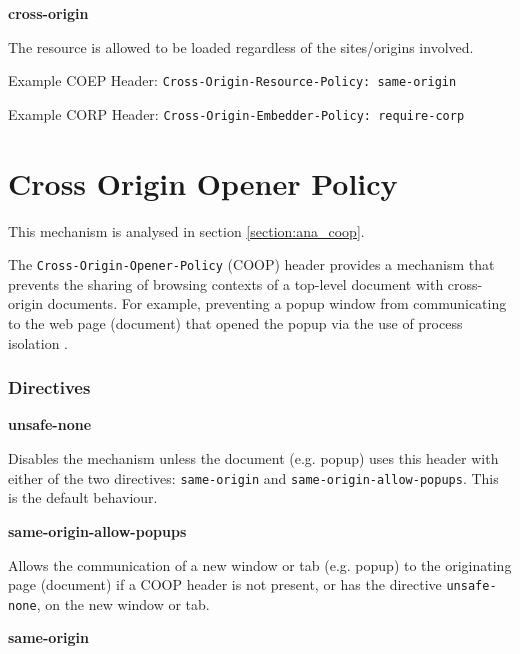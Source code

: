 \documentclass{mscreport}
\begin{document}
\vspace{0.7cm} \noindent
\textbf{cross-origin}

\vspace{0.3cm} \noindent
The resource is allowed to be loaded regardless of the sites/origins involved.

\vspace{0.3cm} \noindent
Example COEP Header: \texttt{Cross-Origin-Resource-Policy: same-origin}

\vspace{0.3cm} \noindent
Example CORP Header: \texttt{Cross-Origin-Embedder-Policy: require-corp}

\section{Cross Origin Opener Policy}
\label{section:bg_coop}

This mechanism is analysed in section \ref{section:ana_coop}.

\vspace{0.3cm} \noindent
The \texttt{Cross-Origin-Opener-Policy} (COOP) header provides a mechanism that prevents the sharing of browsing contexts of a top-level document with cross-origin documents. For example, preventing a popup window from communicating to the web page (document) that opened the popup via the use of process isolation \cite{Apple_undated-gj}.

\subsubsection{Directives}
\textbf{unsafe-none}

\vspace{0.3cm} \noindent
Disables the mechanism unless the document (e.g. popup) uses this header with either of the two directives: \texttt{same-origin} and \texttt{same-origin-allow-popups}. This is the default behaviour.

\vspace{0.7cm} \noindent
\textbf{same-origin-allow-popups}

\vspace{0.3cm} \noindent
Allows the communication of a new window or tab (e.g. popup) to the originating page (document) if a COOP header is not present, or has the directive \texttt{unsafe-none}, on the new window or tab.

\vspace{0.7cm} \noindent
\textbf{same-origin}
\end{document}
